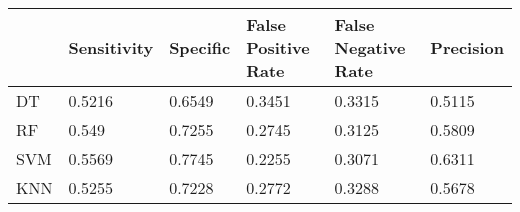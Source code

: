 \begin{table}[!h]
\begin{tabular}{l | l | l| l| l | l}
 & Sensitivity & Specific & False Positive Rate & False Negative Rate & Precision \\\hline
DT & 0.5216 & 0.6549 & 0.3451 & 0.3315 & 0.5115\\
RF & 0.549 & 0.7255 & 0.2745 & 0.3125 & 0.5809\\
SVM & 0.5569 & 0.7745 & 0.2255 & 0.3071 & 0.6311\\
KNN & 0.5255 & 0.7228 & 0.2772 & 0.3288 & 0.5678\\
\end{tabular}
\caption{}
\end{table}
